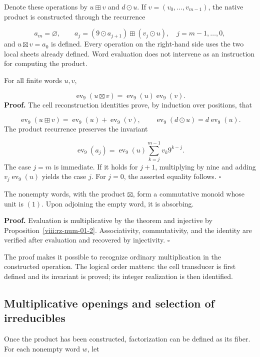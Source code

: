 Denote these operations by $u\boxplus v$ and $d\odot u$. If $v=(v_0,\ldots,v_{m-1})$, the native product is constructed through the recurrence

\[
a_m=\varnothing,\qquad
a_j=(9\odot a_{j+1})\boxplus(v_j\odot u),
\quad j=m-1,\ldots,0,
\]
and $u\boxtimes v=a_0$ is defined. Every operation on the right-hand side uses the two local sheets already defined. Word evaluation does not intervene as an instruction for computing the product.

For all finite words $u,v$,

\[
\operatorname{ev}_9(u\boxtimes v)
=\operatorname{ev}_9(u)\operatorname{ev}_9(v).
\]
\textbf{Proof.} The cell reconstruction identities prove, by induction over positions, that

\[
\operatorname{ev}_9(u\boxplus v)
=\operatorname{ev}_9(u)+\operatorname{ev}_9(v),\qquad
\operatorname{ev}_9(d\odot u)=d\operatorname{ev}_9(u).
\]
The product recurrence preserves the invariant

\[
\operatorname{ev}_9(a_j)
=\operatorname{ev}_9(u)\sum_{k=j}^{m-1}v_k9^{k-j}.
\]
The case $j=m$ is immediate. If it holds for $j+1$, multiplying by nine and adding $v_j\operatorname{ev}_9(u)$ yields the case $j$. For $j=0$, the asserted equality follows. \hfill\(\square\)

The nonempty words, with the product $\boxtimes$, form a commutative monoid whose unit is $(1)$. Upon adjoining the empty word, it is absorbing.

\textbf{Proof.} Evaluation is multiplicative by the theorem and injective by Proposition~\ref{viii:rz-num-01-2}. Associativity, commutativity, and the identity are verified after evaluation and recovered by injectivity. \hfill\(\square\)

The proof makes it possible to recognize ordinary multiplication in the constructed operation. The logical order matters: the cell transducer is first defined and its invariant is proved; its integer realization is then identified.

\subsection{Multiplicative openings and selection of irreducibles}
Once the product has been constructed, factorization can be defined as its fiber. For each nonempty word $w$, let

